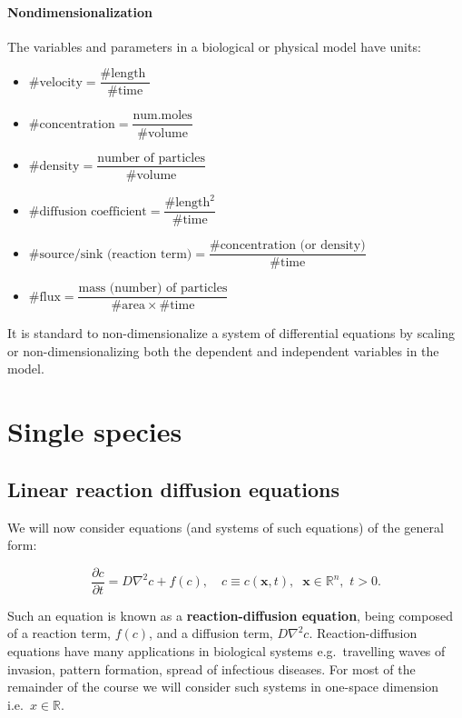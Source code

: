 \documentclass[
  letterpaper,
  DIV=11,
  numbers=noendperiod]{scrreprt}
\providecommand{\tightlist}{%
  \setlength{\itemsep}{0pt}\setlength{\parskip}{0pt}}\usepackage{longtable,booktabs,array}
\theoremstyle{plain}
\theoremstyle{definition}
\theoremstyle{plain}
\theoremstyle{remark}
\begin{document}
\hypertarget{nondimensionalization}{%
\subsection{Nondimensionalization}\label{nondimensionalization}}

The variables and parameters in a biological or physical model have
units:

\begin{itemize}
\tightlist
\item
  \(\#\textrm{velocity} = \dfrac{\#\text{length }}{\#\text{time}}\)
\item
  \(\# \textrm{concentration} = \dfrac{ \text{num.moles}}{\#\text{volume}}\)
\item
  \(\#\text{density} = \dfrac{\text{number of particles}}{\# \text{volume}}\)
\item
  \(\#\text{diffusion coefficient} = \dfrac{\#\text{length}^2}{\#\text{time}}\)
\item
  \(\#\text{source/sink (reaction term)} = \dfrac{\#\text{concentration (or density)}}{\#\text{time}}\)
\item
  \(\#\text{flux} = \dfrac{\text{mass (number) of particles}}{\#\text{area} \times \# \text{time}}\)
\end{itemize}

It is standard to non-dimensionalize a system of differential equations
by scaling or non-dimensionalizing both the dependent and independent
variables in the model.

\part{Single species}

\hypertarget{linear-reaction-diffusion-equations}{%
\chapter{Linear reaction diffusion
equations}\label{linear-reaction-diffusion-equations}}

We will now consider equations (and systems of such equations) of the
general form:

\[
\frac{\partial c}{\partial t} = D \nabla^2 c + f(c), \quad c \equiv c( {\mathbf{x}} , t ), \;\;  {\mathbf{x}} \in \mathbb R^n, \, \, t >0.
\]

Such an equation is known as a \textbf{reaction-diffusion equation},
being composed of a reaction term, \(f(c)\), and a diffusion term,
\(D \nabla^2 c\). Reaction-diffusion equations have many applications in
biological systems e.g.~travelling waves of invasion, pattern formation,
spread of infectious diseases. For most of the remainder of the course
we will consider such systems in one-space dimension
i.e.~\(x \in \mathbb R\).
\end{document}
